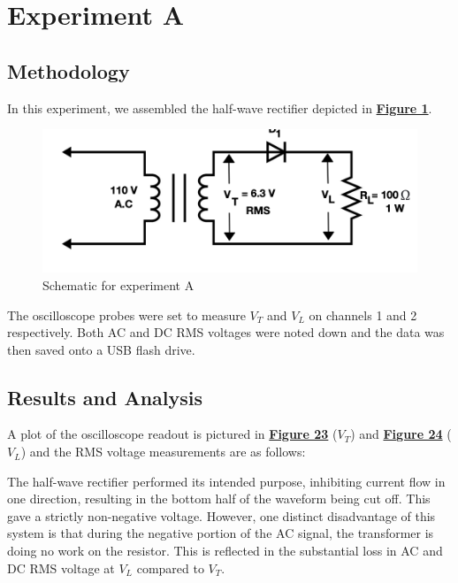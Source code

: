 \documentclass[
	letterpaper
	12pt
]{template}
\newcommand{\bref}[2]{\textbf{\hyperref[#1]{#2}}}
\begin{document}
\section{Experiment A}\label{exp::A}
\subsection{Methodology}\label{method::A}
In this experiment, we assembled the half-wave rectifier depicted in \textbf{\hyperref[apparatus::A]{Figure 1}}.
\begin{figure}[H]\label{apparatus::A}
	\centering
	\begin{minipage}[c]{0.4\textwidth}
		\centering
		\includegraphics[width=\textwidth]{figures/A/schematic.png}
		\caption{Schematic for experiment A \\ \protect\cite{labManual}}
	\end{minipage}
\end{figure}

The oscilloscope probes were set to measure $V_T$ and $V_L$ on channels 1 and 2 respectively. Both AC and DC RMS voltages were noted down and the data was then saved onto a USB flash drive.

\subsection{Results and Analysis}\label{res::A}
A plot of the oscilloscope readout is pictured in \bref{data::A}{Figure 23} ($V_T$) and \bref{data::A}{Figure 24} ($V_L$) and the RMS voltage measurements are as follows:

The half-wave rectifier performed its intended purpose, inhibiting current flow in one direction, resulting in the bottom half of the waveform being cut off. This gave a strictly non-negative voltage. However, one distinct disadvantage of this system is that during the negative portion of the AC signal, the transformer is doing no work on the resistor. This is reflected in the substantial loss in AC and DC RMS voltage at $V_L$ compared to $V_T$.\\
\end{document}
